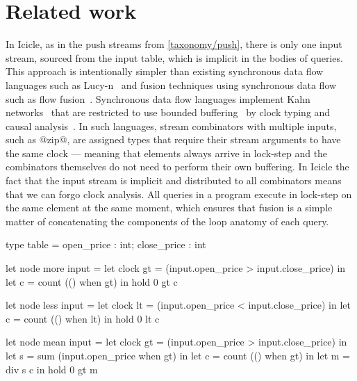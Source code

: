 \section{Related work}
\label{icicle:s:Conclusion}


In Icicle, as in the push streams from \cref{taxonomy/push}, there is only one input stream, sourced from the input table, which is implicit in the bodies of queries.
This approach is intentionally simpler than existing synchronous data flow languages such as Lucy-n~\cite{mandel2010lucy} and fusion techniques using synchronous data flow such as flow fusion~\cite{lippmeier2013data}.
Synchronous data flow languages implement Kahn networks~\cite{vrba2009kahn} that are restricted to use bounded buffering~\cite{johnston2004advances} by clock typing and causal analysis~\cite{stephens1997survey}.
In such languages, stream combinators with multiple inputs, such as @zip@, are assigned types that require their stream arguments to have the same clock --- meaning that elements always arrive in lock-step and the combinators themselves do not need to perform their own buffering.
In Icicle the fact that the input stream is implicit and distributed to all combinators means that we can forgo clock analysis.
All queries in a program execute in lock-step on the same element at the same moment, which ensures that fusion is a simple matter of concatenating the components of the loop anatomy of each query.

\begin{lucy}[float,caption=Lucid-Synchrone implementation of stocks queries,label=icicle:fig:related:lucy:stocks]
type table = { open_price : int; close_price : int }

let node more input =
 let clock gt = (input.open_price > input.close_price)
 in let c     = count (() when gt)
 in hold 0 gt c

let node less input =
 let clock lt = (input.open_price < input.close_price)
 in let c     = count (() when lt)
 in hold 0 lt c

let node mean input =
 let clock gt = (input.open_price > input.close_price)
 in let s     = sum (input.open_price when gt)
 in let c     = count (() when gt)
 in let m     = div s c
 in hold 0 gt m
\end{lucy}

